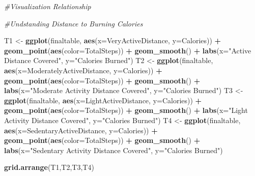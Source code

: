\documentclass[
]{article}
\newenvironment{Shaded}{\begin{snugshade}}{\end{snugshade}}
\newcommand{\AttributeTok}[1]{\textcolor[rgb]{0.13,0.29,0.53}{#1}}
\newcommand{\CommentTok}[1]{\textcolor[rgb]{0.56,0.35,0.01}{\textit{#1}}}
\newcommand{\FunctionTok}[1]{\textcolor[rgb]{0.13,0.29,0.53}{\textbf{#1}}}
\newcommand{\NormalTok}[1]{#1}
\newcommand{\OtherTok}[1]{\textcolor[rgb]{0.56,0.35,0.01}{#1}}
\newcommand{\SpecialCharTok}[1]{\textcolor[rgb]{0.81,0.36,0.00}{\textbf{#1}}}
\newcommand{\StringTok}[1]{\textcolor[rgb]{0.31,0.60,0.02}{#1}}
\begin{document}
\begin{Shaded}
\begin{Highlighting}[]
\CommentTok{\#Visualization Relationship}

\CommentTok{\#Undstanding Distance to Burning Calories}

\NormalTok{T1 }\OtherTok{\textless{}{-}}  \FunctionTok{ggplot}\NormalTok{(finaltable, }\FunctionTok{aes}\NormalTok{(}\AttributeTok{x=}\NormalTok{VeryActiveDistance, }\AttributeTok{y=}\NormalTok{Calories)) }\SpecialCharTok{+} \FunctionTok{geom\_point}\NormalTok{(}\FunctionTok{aes}\NormalTok{(}\AttributeTok{color=}\NormalTok{TotalSteps)) }\SpecialCharTok{+} \FunctionTok{geom\_smooth}\NormalTok{() }\SpecialCharTok{+} \FunctionTok{labs}\NormalTok{(}\AttributeTok{x=}\StringTok{"Active Distance Covered"}\NormalTok{, }\AttributeTok{y=}\StringTok{"Calories Burned"}\NormalTok{)}
\NormalTok{T2 }\OtherTok{\textless{}{-}}  \FunctionTok{ggplot}\NormalTok{(finaltable, }\FunctionTok{aes}\NormalTok{(}\AttributeTok{x=}\NormalTok{ModeratelyActiveDistance, }\AttributeTok{y=}\NormalTok{Calories)) }\SpecialCharTok{+} \FunctionTok{geom\_point}\NormalTok{(}\FunctionTok{aes}\NormalTok{(}\AttributeTok{color=}\NormalTok{TotalSteps)) }\SpecialCharTok{+} \FunctionTok{geom\_smooth}\NormalTok{() }\SpecialCharTok{+} \FunctionTok{labs}\NormalTok{(}\AttributeTok{x=}\StringTok{"Moderate Activity Distance Covered"}\NormalTok{, }\AttributeTok{y=}\StringTok{"Calories Burned"}\NormalTok{)}
\NormalTok{T3 }\OtherTok{\textless{}{-}}  \FunctionTok{ggplot}\NormalTok{(finaltable, }\FunctionTok{aes}\NormalTok{(}\AttributeTok{x=}\NormalTok{LightActiveDistance, }\AttributeTok{y=}\NormalTok{Calories)) }\SpecialCharTok{+} \FunctionTok{geom\_point}\NormalTok{(}\FunctionTok{aes}\NormalTok{(}\AttributeTok{color=}\NormalTok{TotalSteps)) }\SpecialCharTok{+} \FunctionTok{geom\_smooth}\NormalTok{() }\SpecialCharTok{+} \FunctionTok{labs}\NormalTok{(}\AttributeTok{x=}\StringTok{"Light Activity Distance Covered"}\NormalTok{, }\AttributeTok{y=}\StringTok{"Calories Burned"}\NormalTok{)}
\NormalTok{T4 }\OtherTok{\textless{}{-}}  \FunctionTok{ggplot}\NormalTok{(finaltable, }\FunctionTok{aes}\NormalTok{(}\AttributeTok{x=}\NormalTok{SedentaryActiveDistance, }\AttributeTok{y=}\NormalTok{Calories)) }\SpecialCharTok{+} \FunctionTok{geom\_point}\NormalTok{(}\FunctionTok{aes}\NormalTok{(}\AttributeTok{color=}\NormalTok{TotalSteps)) }\SpecialCharTok{+} \FunctionTok{geom\_smooth}\NormalTok{() }\SpecialCharTok{+} \FunctionTok{labs}\NormalTok{(}\AttributeTok{x=}\StringTok{"Sedentary Activity Distance Covered"}\NormalTok{, }\AttributeTok{y=}\StringTok{"Calories Burned"}\NormalTok{)}

\FunctionTok{grid.arrange}\NormalTok{(T1,T2,T3,T4)}
\end{Highlighting}
\end{Shaded}
\end{document}
